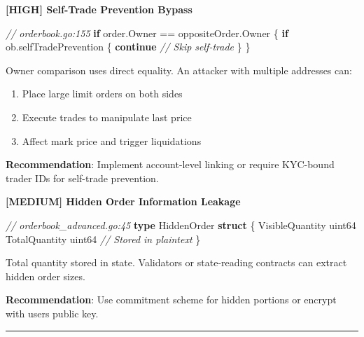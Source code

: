 \documentclass[
]{article}
\newenvironment{Shaded}{}{}
\newcommand{\CommentTok}[1]{\textcolor[rgb]{0.38,0.63,0.69}{\textit{#1}}}
\newcommand{\ControlFlowTok}[1]{\textcolor[rgb]{0.00,0.44,0.13}{\textbf{#1}}}
\newcommand{\DataTypeTok}[1]{\textcolor[rgb]{0.56,0.13,0.00}{#1}}
\newcommand{\KeywordTok}[1]{\textcolor[rgb]{0.00,0.44,0.13}{\textbf{#1}}}
\newcommand{\NormalTok}[1]{#1}
\newcommand{\OperatorTok}[1]{\textcolor[rgb]{0.40,0.40,0.40}{#1}}
\providecommand{\tightlist}{%
  \setlength{\itemsep}{0pt}\setlength{\parskip}{0pt}}
\begin{document}
\textbf{{[}HIGH{]} Self-Trade Prevention Bypass}

\begin{Shaded}
\begin{Highlighting}[]
\CommentTok{// orderbook.go:155}
\ControlFlowTok{if}\NormalTok{ order}\OperatorTok{.}\NormalTok{Owner }\OperatorTok{==}\NormalTok{ oppositeOrder}\OperatorTok{.}\NormalTok{Owner }\OperatorTok{\{}
    \ControlFlowTok{if}\NormalTok{ ob}\OperatorTok{.}\NormalTok{selfTradePrevention }\OperatorTok{\{}
        \ControlFlowTok{continue} \CommentTok{// Skip self{-}trade}
    \OperatorTok{\}}
\OperatorTok{\}}
\end{Highlighting}
\end{Shaded}

Owner comparison uses direct equality. An attacker with multiple
addresses can:

\begin{enumerate}
\def\labelenumi{\arabic{enumi}.}
\tightlist
\item
  Place large limit orders on both sides
\item
  Execute trades to manipulate last price
\item
  Affect mark price and trigger liquidations
\end{enumerate}

\textbf{Recommendation}: Implement account-level linking or require
KYC-bound trader IDs for self-trade prevention.

\textbf{{[}MEDIUM{]} Hidden Order Information Leakage}

\begin{Shaded}
\begin{Highlighting}[]
\CommentTok{// orderbook\_advanced.go:45}
\KeywordTok{type}\NormalTok{ HiddenOrder }\KeywordTok{struct} \OperatorTok{\{}
\NormalTok{    VisibleQuantity }\DataTypeTok{uint64}
\NormalTok{    TotalQuantity   }\DataTypeTok{uint64}  \CommentTok{// Stored in plaintext}
\OperatorTok{\}}
\end{Highlighting}
\end{Shaded}

Total quantity stored in state. Validators or state-reading contracts
can extract hidden order sizes.

\textbf{Recommendation}: Use commitment scheme for hidden portions or
encrypt with user\textquotesingle s public key.

\begin{center}\rule{0.5\linewidth}{0.5pt}\end{center}
\end{document}
